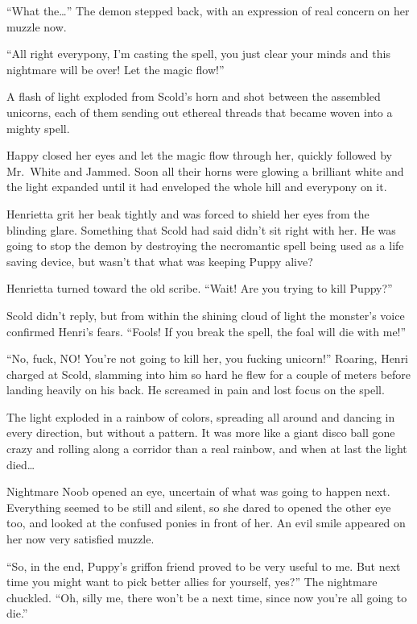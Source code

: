 ``What the\dots'' The demon stepped back, with an expression of real concern on her muzzle now.

``All right everypony, I'm casting the spell, you just clear your minds and this nightmare will be over! Let the magic flow!''

A flash of light exploded from Scold's horn and shot between the assembled unicorns, each of them sending out ethereal threads that became woven into a mighty spell.

Happy closed her eyes and let the magic flow through her, quickly followed by Mr.~White and Jammed. Soon all their horns were glowing a brilliant white and the light expanded until it had enveloped the whole hill and everypony on it.

Henrietta grit her beak tightly and was forced to shield her eyes from the blinding glare. Something that Scold had said didn't sit right with her. He was going to stop the demon by destroying the necromantic spell being used as a life saving device, but wasn't that what was keeping Puppy alive?

Henrietta turned toward the old scribe. ``Wait! Are you trying to kill Puppy?''

Scold didn't reply, but from within the shining cloud of light the monster's voice confirmed Henri's fears. ``Fools! If you break the spell, the foal will die with me!''

``No, fuck, NO! You're not going to kill her, you fucking unicorn!'' Roaring, Henri charged at Scold, slamming into him so hard he flew for a couple of meters before landing heavily on his back. He screamed in pain and lost focus on the spell.

The light exploded in a rainbow of colors, spreading all around and dancing in every direction, but without a pattern. It was more like a giant disco ball gone crazy and rolling along a corridor than a real rainbow, and when at last the light died\dots

Nightmare Noob opened an eye, uncertain of what was going to happen next. Everything seemed to be still and silent, so she dared to opened the other eye too, and looked at the confused ponies in front of her. An evil smile appeared on her now very satisfied muzzle.

``So, in the end, Puppy's griffon friend proved to be very useful to me. But next time you might want to pick better allies for yourself, yes?'' The nightmare chuckled. ``Oh, silly me, there won't be a next time, since now you're all going to die.''

